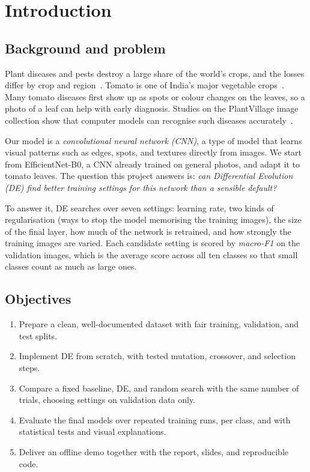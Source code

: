 \chapter{Introduction}
\section{Background and problem}
Plant diseases and pests destroy a large share of the world's crops, and the losses differ by crop and region~\cite{savary2019losses}. Tomato is one of India's major vegetable crops~\cite{pib2026tomato}. Many tomato diseases first show up as spots or colour changes on the leaves, so a photo of a leaf can help with early diagnosis. Studies on the PlantVillage image collection show that computer models can recognise such diseases accurately~\cite{hughes2015dataset,mohanty2016plant}.

Our model is a \emph{convolutional neural network (CNN)}, a type of model that learns visual patterns such as edges, spots, and textures directly from images. We start from EfficientNet-B0, a CNN already trained on general photos, and adapt it to tomato leaves. The question this project answers is: \emph{can Differential Evolution (DE) find better training settings for this network than a sensible default?}

To answer it, DE searches over seven settings: learning rate, two kinds of regularisation (ways to stop the model memorising the training images), the size of the final layer, how much of the network is retrained, and how strongly the training images are varied. Each candidate setting is scored by \emph{macro-F1} on the validation images, which is the average score across all ten classes so that small classes count as much as large ones.

\section{Objectives}
\begin{enumerate}
\item Prepare a clean, well-documented dataset with fair training, validation, and test splits.
\item Implement DE from scratch, with tested mutation, crossover, and selection steps.
\item Compare a fixed baseline, DE, and random search with the same number of trials, choosing settings on validation data only.
\item Evaluate the final models over repeated training runs, per class, and with statistical tests and visual explanations.
\item Deliver an offline demo together with the report, slides, and reproducible code.
\end{enumerate}


